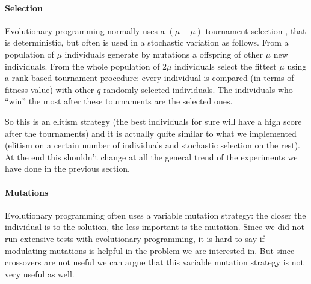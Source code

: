 \paragraph{Selection}
Evolutionary programming normally uses a $(\mu + \mu)$ tournament selection \cite{introtoec}, that is deterministic, but often is used in a stochastic variation as follows. From a population of $\mu$ individuals generate by mutations a offspring of other $\mu$ new individuals. From the whole population of $2\mu$ individuals select the fittest $\mu$ using a rank-based tournament procedure: every individual is compared (in terms of fitness value) with other $q$ randomly selected individuals. The individuals who ``win'' the most after these tournaments are the selected ones. 

So this is an elitism strategy (the best individuals for sure will have a high score after the tournaments) and it is actually quite similar to what we implemented (elitism on a certain number of individuals and stochastic selection on the rest). At the end this shouldn't change at all the general trend of the experiments we have done in the previous section.

\paragraph{Mutations}
Evolutionary programming often uses a variable mutation strategy: the closer the individual is to the solution, the less important is the mutation. Since we did not run extensive tests with evolutionary programming, it is hard to say if modulating mutations is helpful in the problem we are interested in. But since crossovers are not useful we can argue that this variable mutation strategy is not very useful as well. 


